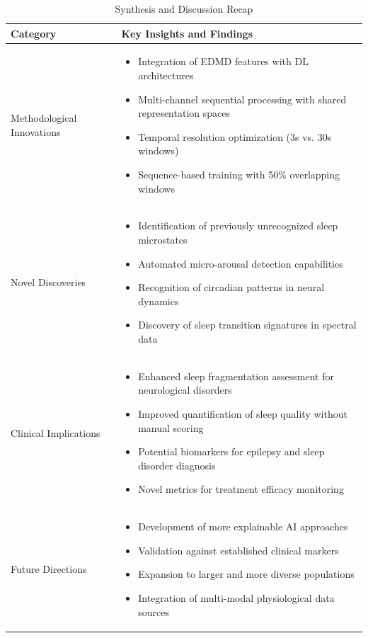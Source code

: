 \documentclass[a4paper,12pt,twoside]{article}
\begin{document}
\begin{table}[H]
\centering
\caption{Synthesis and Discussion Recap}
\begin{tabular}{|p{3.5cm}|p{10.5cm}|}
\hline
\textbf{Category} & \textbf{Key Insights and Findings} \\
\hline
Methodological Innovations & 
\begin{itemize}
  \item Integration of EDMD features with DL architectures
  \item Multi-channel sequential processing with shared representation spaces
  \item Temporal resolution optimization (3s vs. 30s windows)
  \item Sequence-based training with 50\% overlapping windows
\end{itemize} \\
\hline
Novel Discoveries & 
\begin{itemize}
  \item Identification of previously unrecognized sleep microstates
  \item Automated micro-arousal detection capabilities
  \item Recognition of circadian patterns in neural dynamics
  \item Discovery of sleep transition signatures in spectral data
\end{itemize} \\
\hline
Clinical Implications & 
\begin{itemize}
  \item Enhanced sleep fragmentation assessment for neurological disorders
  \item Improved quantification of sleep quality without manual scoring
  \item Potential biomarkers for epilepsy and sleep disorder diagnosis
  \item Novel metrics for treatment efficacy monitoring
\end{itemize} \\
\hline
Future Directions & 
\begin{itemize}
  \item Development of more explainable AI approaches
  \item Validation against established clinical markers
  \item Expansion to larger and more diverse populations
  \item Integration of multi-modal physiological data sources
\end{itemize} \\
\hline
\end{tabular}
\label{tab:synthesis_discussion_summary}
\end{table}
\end{document}
